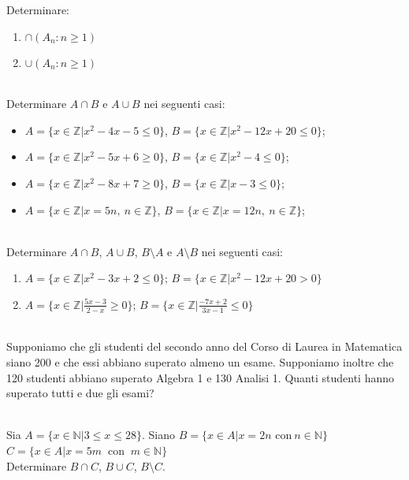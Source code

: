 \documentclass{article}
\begin{document}
Determinare:
\begin{enumerate}
\item$\cap (A_n : n\geq 1)  $
\item$\cup (A_n : n\geq 1)$
\end{enumerate}

\vspace{0,2cm}
\\
Determinare $A\cap B$ e $A\cup B$ nei seguenti casi:
\begin{itemize}
	\item $A=\{x\in \mathbb{Z} |x^2-4x-5\leq 0 \}$, $B=\{x\in \mathbb{Z} |x^2-12x+20\leq0\}$;
	\item $A=\{x\in \mathbb{Z} |x^2-5x+6\geq 0\}$, $B=\{x\in \mathbb{Z} |x^2-4\leq 0\}$;
	\item $A=\{x\in \mathbb{Z} |x^2-8x+7\geq 0\}$, $B=\{x\in \mathbb{Z} |x-3\leq 0\}$;
	\item $A=\{x\in \mathbb{Z} |x=5n,\ n\in \mathbb{Z}\}$, $B=\{x\in \mathbb{Z} |x=12n,\ n\in \mathbb{Z}\}$;
	
\end{itemize}

\vspace{0,2cm}
\\
Determinare $A\cap B$, $A\cup B$, $B\setminus A$ e $A\setminus B$ nei seguenti casi:

\begin{enumerate} 

\item $A=\{x\in \mathbb{Z} |x^2 -3x+2\leq 0 \}$; $B=\{x\in \mathbb{Z} |x^2 -12x+20>0\}$
\item $A=\{x\in \mathbb{Z} |\frac {5x-3}{2-x}\geq 0\}$; $B=\{x\in \mathbb{Z} |\frac {-7x+2}{3x-1}\leq 0\}$

\end{enumerate}

\vspace{0,2cm}
\\
Supponiamo che gli studenti del secondo anno del Corso di Laurea in
Matematica siano 200 e che essi abbiano superato almeno un esame.
Supponiamo inoltre che 120 studenti abbiano superato Algebra 1 e
130 Analisi 1.
Quanti studenti hanno superato tutti e due gli esami?

\vspace{0,2cm}
\\
Sia $A=\{x\in \mathbb{N} |3\leq x\leq 28 \}$. Siano $B=\{x\in A|x=2n$ con$ \: n\in \mathbb{N} \}$
$C=\{x\in A|x=5m \:$ con $  \: m\in \mathbb{N} \}$\\
Determinare $B\cap C$, $B\cup C$, $B\setminus C$.
\end{document}
